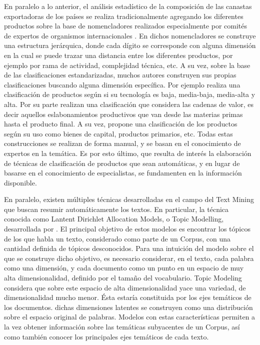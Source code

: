 \documentclass[runningheads,a4paper]{llncs}
\begin{document}
En paralelo a lo anterior, el análisis estadístico de la composición de las canastas exportadoras de los países se realiza tradicionalmente agregando los diferentes productos sobre la base de nomencladores realizados especialmente por comités de expertos de organismos internacionales \citep{un2006standard,HS2012}. En dichos nomencladores se construye una estructura jerárquica, donde cada dígito se corresponde con alguna dimensión en la cual se puede trazar una distancia entre los diferentes productos, por ejemplo por rama de actividad, complejidad técnica, etc. A su vez, sobre la base de las clasificaciones estandarizadas, muchos autores construyen sus propias clasificaciones buscando alguna dimensión específica. Por ejemplo \citet{lall2000technological} realiza una clasificación de productos según si su tecnología es baja, media-baja, media-alta y alta. Por su parte \citet{molinari2016especializacion} realizan una clasificación que considera las cadenas de valor, es decir aquellos eslabonamientos productivos que van desde las materias primas hasta el producto final. A su vez, \citet{flores2008world} propone una clasificación de los productos según su uso como bienes de capital, productos primarios, etc. Todas estas construcciones se realizan de forma manual, y se basan en el conocimiento de expertos en la temática. Es por esto último, que resulta de interés la elaboración de técnicas de clasificación de productos que sean automáticas, y en lugar de basarse en el conocimiento de especialistas, se fundamenten en la información disponible. 
  
En paralelo, existen múltiples técnicas desarrolladas en el campo del Text Mining que buscan resumir automáticamente los textos. En particular, la técnica conocida como Lantent Dirichlet Allocation Models, o Topic Modelling, desarrollada por \citet{LDA}.
El principal objetivo de estos modelos es encontrar los tópicos de los que habla un texto, considerado como parte de un Corpus, con una cantidad definida de tópicos desconocidos. 
Para una intuición del modelo sobre el que se construye dicho objetivo, es necesario considerar, en el texto, cada palabra como una dimensión, y cada documento como un punto en un espacio de muy alta dimensionalidad, definido por el tamaño del vocabulario. Topic Modeling considera que sobre este espacio de alta dimensionalidad yace una variedad, de dimensionalidad mucho menor. Ésta estaría constituida por los ejes temáticos de los documentos. dichas dimensiones latentes se construyen como una distribución sobre el espacio original de palabras. Modelos con estas características permiten a la vez obtener información sobre las temáticas subyacentes de un Corpus, así como también conocer los principales ejes temáticos de cada texto. 
\end{document}
